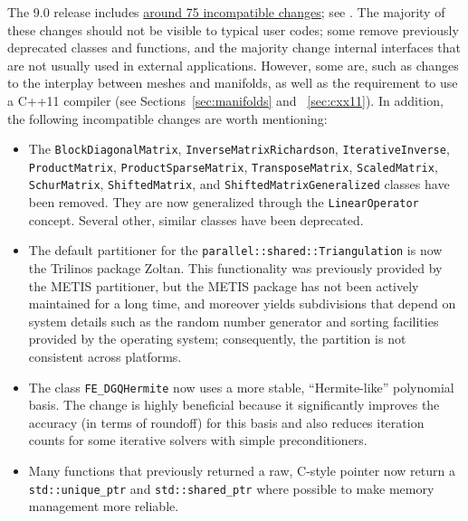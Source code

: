 \documentclass{ansarticle-preprint}
\begin{document}
The 9.0 release includes
\href{https://www.dealii.org/developer/doxygen/deal.II/changes_between_8_5_and_9_0.html}
     {around 75 incompatible changes}; see \cite{changes90}. The majority of these changes
should not be visible to typical user codes; some remove previously
deprecated classes and functions, and the majority change internal
interfaces that are not usually used in external
applications. However, some are, such as changes to the interplay between meshes and
manifolds, as well as the requirement to use a
C++11 compiler (see Sections~\ref{sec:manifolds} and
~\ref{sec:cxx11}). In addition, the following
incompatible changes are worth mentioning:
\begin{itemize}
\item The \texttt{BlockDiagonalMatrix},
  \texttt{InverseMatrixRichardson},
  \texttt{IterativeInverse},
  \texttt{ProductMatrix},
  \texttt{ProductSparseMatrix},
  \texttt{TransposeMatrix},
  \texttt{ScaledMatrix},
  \texttt{SchurMatrix},
  \texttt{ShiftedMatrix}, and
  \texttt{ShiftedMatrixGeneralized} classes have been removed. They are now
  generalized through the \texttt{LinearOperator} concept. Several
  other, similar classes have been deprecated.

  \item The default partitioner for the
    \texttt{parallel::shared::Triangulation} is now the Trilinos
    package Zoltan. This functionality was previously provided by the
    METIS partitioner, but the METIS package has not been actively maintained
    for a long time, and moreover yields subdivisions that depend on
    system details such as the random number generator and sorting
    facilities provided by the operating system; consequently, the
    partition is not consistent across platforms.

  \item  The class \texttt{FE\_DGQHermite}  now uses a more stable,
    ``Hermite-like'' polynomial basis. The change is highly
    beneficial because it significantly improves the accuracy (in
    terms of roundoff) for this basis and also reduces iteration
    counts for some iterative solvers with simple preconditioners.

  \item Many functions that previously returned a raw, C-style pointer
    now return a \texttt{std::unique\_ptr} and
    \texttt{std::shared\_ptr} where possible to make memory management
    more reliable.
\end{itemize}
\end{document}
